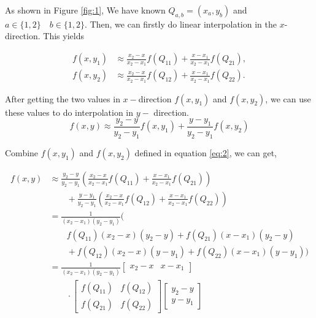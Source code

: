     As shown in Figure \ref{fig:1}, We have known $Q_{a, b} = (x_a, y_ b)$ and $a\in\{1, 2\}\quad b\in\{1,2\}$. Then, we can firstly do linear interpolation in the $x$-direction. This yields

    \begin{equation}
        \begin{aligned}
            f(x,y_{1})&\approx {\frac {x_{2}-x}{x_{2}-x_{1}}}f(Q_{11})+{\frac {x-x_{1}}{x_{2}-x_{1}}}f(Q_{21}),\\f(x,y_{2})&\approx {\frac {x_{2}-x}{x_{2}-x_{1}}}f(Q_{12})+{\frac {x-x_{1}}{x_{2}-x_{1}}}f(Q_{22}).
        \end{aligned}
        \label{eq:2}
    \end{equation}

    After getting the two values in $x-$direction $f(x, y_1)$ and $f(x, y_2)$, we can use these values to do interpolation in $y-$ direction.
    \begin{equation}
        f(x,y) \approx {\frac {y_{2}-y}{y_{2}-y_{1}}}f(x,y_{1})+{\frac {y-y_{1}}{y_{2}-y_{1}}}f(x,y_{2})
    \end{equation}

    Combine $f(x, y_1)$ and $f(x, y_2)$ defined in equation \ref{eq:2}, we can get,

    \begin{equation}
        \begin{aligned}
        f(x,y)&\approx{\frac {y_{2}-y}{y_{2}-y_{1}}}\left({\frac {x_{2}-x}{x_{2}-x_{1}}}f(Q_{11})+{\frac {x-x_{1}}{x_{2}-x_{1}}}f(Q_{21})\right)\\&\qquad+{\frac {y-y_{1}}{y_{2}-y_{1}}}\left({\frac {x_{2}-x}{x_{2}-x_{1}}}f(Q_{12})+{\frac {x-x_{1}}{x_{2}-x_{1}}}f(Q_{22})\right)\\&={\frac {1}{(x_{2}-x_{1})(y_{2}-y_{1})}}{\big (}\\&\qquad f(Q_{11})(x_{2}-x)(y_{2}-y)+f(Q_{21})(x-x_{1})(y_{2}-y)\\&\qquad+f(Q_{12})(x_{2}-x)(y-y_{1})+f(Q_{22})(x-x_{1})(y-y_{1}){\big )}\\&={\frac {1}{(x_{2}-x_{1})(y_{2}-y_{1})}}{\begin{bmatrix}x_{2}-x&x-x_{1}\end{bmatrix}}\\&\qquad \cdot {\begin{bmatrix}f(Q_{11})&f(Q_{12})\\f(Q_{21})&f(Q_{22})\end{bmatrix}}{\begin{bmatrix}y_{2}-y\\y-y_{1}\end{bmatrix}}
        \end{aligned}
        \label{interpolation}
    \end{equation}


